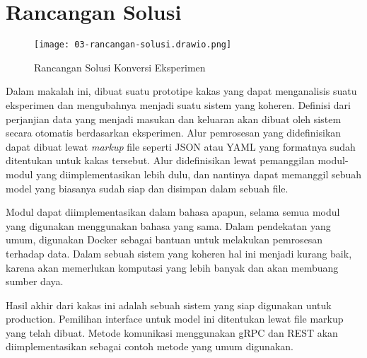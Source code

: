 \section{Rancangan Solusi}

\begin{figure}[ht]
  \centering
  \texttt{[image: 03-rancangan-solusi.drawio.png]}
  \caption{Rancangan Solusi Konversi Eksperimen}
\end{figure}

Dalam makalah ini, dibuat suatu prototipe kakas yang dapat menganalisis suatu eksperimen dan mengubahnya menjadi suatu sistem yang koheren.
Definisi dari perjanjian data yang menjadi masukan dan keluaran akan dibuat oleh sistem secara otomatis berdasarkan eksperimen.
Alur pemrosesan yang didefinisikan dapat dibuat lewat \textit{markup} file seperti JSON atau YAML yang formatnya sudah ditentukan untuk kakas tersebut.
Alur didefinisikan lewat pemanggilan modul-modul yang diimplementasikan lebih dulu, dan nantinya dapat memanggil sebuah model yang biasanya sudah siap dan disimpan dalam sebuah file.

Modul dapat diimplementasikan dalam bahasa apapun, selama semua modul yang digunakan menggunakan bahasa yang sama.
Dalam pendekatan yang umum, digunakan Docker sebagai bantuan untuk melakukan pemrosesan terhadap data.
Dalam sebuah sistem yang koheren hal ini menjadi kurang baik, karena akan memerlukan komputasi yang lebih banyak dan akan membuang sumber daya.

Hasil akhir dari kakas ini adalah sebuah sistem yang siap digunakan untuk production.
Pemilihan interface untuk model ini ditentukan lewat file markup yang telah dibuat.
Metode komunikasi menggunakan gRPC dan REST akan diimplementasikan sebagai contoh metode yang umum digunakan.


